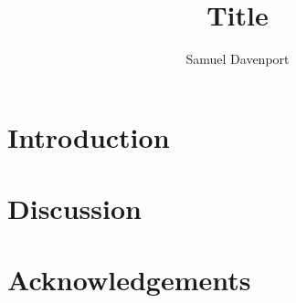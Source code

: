 \documentclass[12pt]{article}
\title{Title}
\author{Samuel Davenport}
\theoremstyle{definition}
\begin{document}
	
\maketitle

\begin{abstract}
	
\end{abstract}

\section{Introduction}




\section{Discussion}


\section*{Acknowledgements}





%
\end{document}
